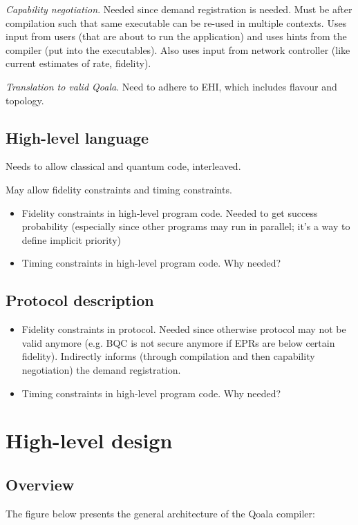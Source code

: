 \textit{Capability negotiation}. Needed since demand registration is needed. Must be after compilation such that same executable can be re-used in multiple contexts. Uses input from users (that are about to run the application) and uses hints from the compiler (put into the executables). Also uses input from network controller (like current estimates of rate, fidelity).


\textit{Translation to valid Qoala}. Need to adhere to EHI, which includes flavour and topology.



\subsection{High-level language}
Needs to allow classical and quantum code, interleaved.

May allow fidelity constraints and timing constraints.

\begin{itemize}
    \item Fidelity constraints in high-level program code. Needed to get success probability (especially since other programs may run in parallel; it's a way to define implicit priority)
    \item Timing constraints in high-level program code. Why needed?
\end{itemize}


\subsection{Protocol description}
\begin{itemize}
    \item Fidelity constraints in protocol. Needed since otherwise protocol may not be valid anymore (e.g. BQC is not secure anymore if EPRs are below certain fidelity). Indirectly informs (through compilation and then capability negotiation) the demand registration.
    \item Timing constraints in high-level program code. Why needed?
\end{itemize}



\section{High-level design}

\subsection{Overview}
The figure below presents the general architecture of the Qoala compiler:

